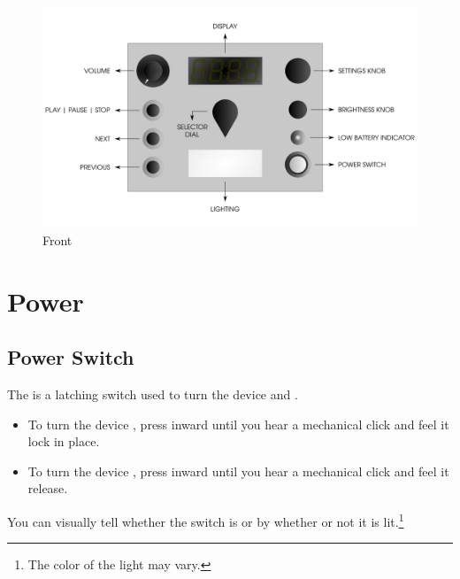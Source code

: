 \begin{figure}[H]
\centering
  \includegraphics{images/front_panel.png}
\caption{Front}
\end{figure}

\section{Power}

\subsection{Power Switch} \label{Power Switch}

The  is a latching switch used to turn the device  and .
\begin{itemize}
  \item To turn the device , press inward until you hear a mechanical
    click and feel it lock in place.
  \item To turn the device , press inward until you hear a mechanical
    click and feel it release.
\end{itemize}

You can visually tell whether the switch is  or  by whether or
not it is lit.\footnote{ The color of the light may vary.}

